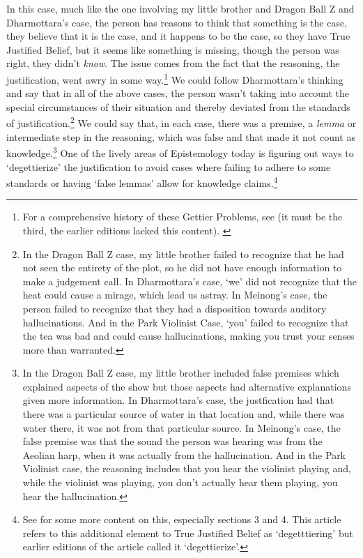 In this case, much like the one involving my little brother and Dragon Ball Z and Dharmottara's case, the person has reasons to think that something is the case, they believe that it is the case, and it happens to be the case, so they have True Justified Belief, but it seems like something is missing, though the person was right, they didn't \emph{know}. The issue comes from the fact that the reasoning, the justification, went awry in some way.\footnote{For a comprehensive history of these Gettier Problems, see  (it must be the third, the earlier editions lacked this content). \autocite[p. 91-99]{Chisholm1}} We could follow Dharmottara's thinking and say that in all of the above cases, the person wasn't taking into account the special circumstances of their situation and thereby deviated from the standards of justification.\footnote{In the Dragon Ball Z case, my little brother failed to recognize that he had not seen the entirety of the plot, so he did not have enough information to make a judgement call. In Dharmottara's case, `we' did not recognize that the heat could cause a mirage, which lead us astray. In Meinong's case, the person failed to recognize that they had a disposition towards auditory hallucinations. And in the Park Violinist Case, `you' failed to recognize that the tea was bad and could cause hallucinations, making you trust your senses more than warranted.} We could say that, in each case, there was a premise, a \emph{lemma} or intermediate step in the reasoning, which was false and that made it not count as knowledge.\footnote{In the Dragon Ball Z case, my little brother included false premises which explained aspects of the show but those aspects had alternative explanations given more information. In Dharmottara's case, the justfication had that there was a particular source of water in that location and, while there was water there, it was not from that particular source. In Meinong's case, the false premise was that the sound the person was hearing was from the Aeolian harp, when it was actually from the hallucination. And in the Park Violinist case, the reasoning includes that you hear the violinist playing and, while the violinist was playing, you don't actually hear them playing, you hear the hallucination.} One of the lively areas of Epistemology today is figuring out ways to `degettierize' the justification to avoid cases where failing to adhere to some standards or having `false lemmas' allow for knowledge claims.\footnote{See  for some more content on this, especially sections 3 and 4. This article refers to this additional element to True Justified Belief as `degetttiering' but earlier editions of the article called it `degettierize'. }

